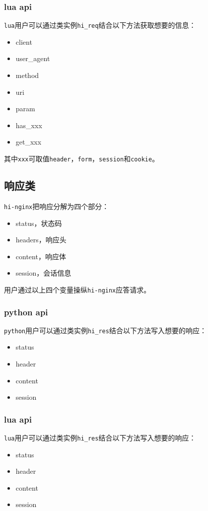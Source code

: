 \subsubsection{lua api}
\texttt{lua}用户可以通过类实例\texttt{hi_req}结合以下方法获取想要的信息：
\begin{itemize}
\item client
\item user_agent
\item method
\item uri
\item param
\item has_xxx 
\item get_xxx
\end{itemize}
其中\texttt{xxx}可取值\texttt{header}，\texttt{form}，\texttt{session}和\texttt{cookie}。
\subsection{响应类}
\texttt{hi-nginx}把响应分解为四个部分：
\begin{itemize}
\item status，状态码
\item headers，响应头
\item content，响应体
\item session，会话信息
\end{itemize}
用户通过以上四个变量操纵\texttt{hi-nginx}应答请求。
\subsubsection{python api}
\texttt{python}用户可以通过类实例\texttt{hi_res}结合以下方法写入想要的响应：
\begin{itemize}
\item status
\item header
\item content
\item session
\end{itemize}
\subsubsection{lua api}
\texttt{lua}用户可以通过类实例\texttt{hi_res}结合以下方法写入想要的响应：
\begin{itemize}
\item status
\item header
\item content
\item session
\end{itemize}


